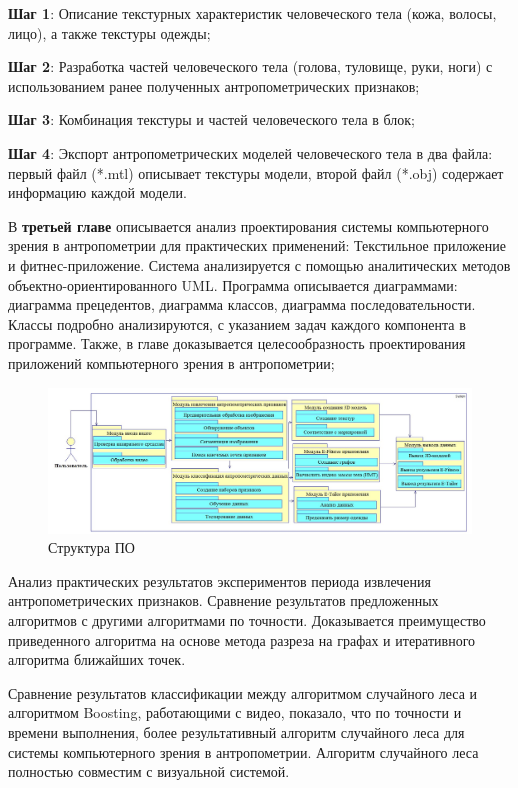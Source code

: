 	\textbf{ Шаг 1}: Описание текстурных характеристик человеческого тела (кожа, волосы, лицо), а также текстуры одежды;
	
   \textbf{Шаг 2}: Разработка частей человеческого тела (голова, туловище, руки, ноги) с использованием ранее полученных антропометрических признаков;
	
\textbf{Шаг 3}: Комбинация текстуры и частей человеческого тела в блок;

\textbf{Шаг 4}: Экспорт антропометрических моделей человеческого тела в два файла: первый файл (*.mtl) описывает текстуры модели, второй файл (*.obj) содержает информацию каждой модели.

В \textbf {третьей главе} описывается анализ проектирования системы компьютерного зрения в антропометрии для практических применений: Текстильное приложение и фитнес-приложение. Система анализируется с помощью аналитических методов объектно-ориентированного UML. Программа описывается диаграммами: диаграмма прецедентов, диаграмма классов, диаграмма последовательности. Классы подробно анализируются, с указанием задач каждого компонента в программе. Также, в главе доказывается целесообразность проектирования приложений компьютерного зрения в антропометрии;
\begin{figure}[ht!]
\centering
\includegraphics [scale=0.4] {images/h35.png}
\begin{center}
\caption{Структура ПО} \label{img35}
\end{center}
\end{figure}

Анализ практических результатов экспериментов периода извлечения антропометрических признаков. Сравнение результатов предложенных алгоритмов с другими алгоритмами по точности. Доказывается преимущество приведенного алгоритма на основе метода разреза на графах и итеративного алгоритма ближайших точек.

Сравнение результатов классификации между алгоритмом случайного леса и алгоритмом Boosting, работающими с видео, показало, что по точности и времени выполнения, более результативный алгоритм случайного леса для системы компьютерного зрения в антропометрии. Алгоритм случайного леса полностью совместим с визуальной системой.

